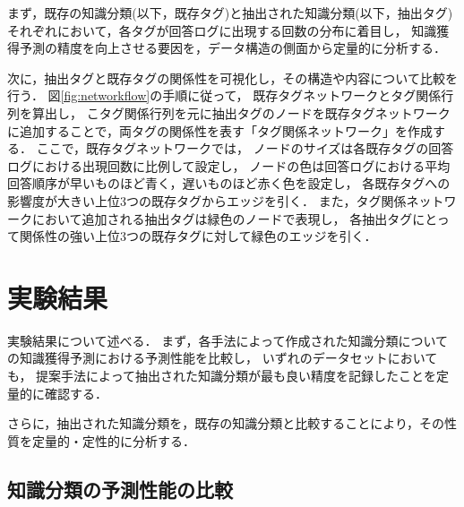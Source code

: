 まず，既存の知識分類(以下，既存タグ)と抽出された知識分類(以下，抽出タグ)それぞれにおいて，各タグが回答ログに出現する回数の分布に着目し，
知識獲得予測の精度を向上させる要因を，データ構造の側面から定量的に分析する．

次に，抽出タグと既存タグの関係性を可視化し，その構造や内容について比較を行う．
図\ref{fig:networkflow}の手順に従って，
既存タグネットワークとタグ関係行列を算出し，
こタグ関係行列を元に抽出タグのノードを既存タグネットワークに追加することで，両タグの関係性を表す「タグ関係ネットワーク」を作成する．
ここで，既存タグネットワークでは，
ノードのサイズは各既存タグの回答ログにおける出現回数に比例して設定し，
ノードの色は回答ログにおける平均回答順序が早いものほど青く，遅いものほど赤く色を設定し，
各既存タグへの影響度が大きい上位3つの既存タグからエッジを引く．
また，タグ関係ネットワークにおいて追加される抽出タグは緑色のノードで表現し，
各抽出タグにとって関係性の強い上位3つの既存タグに対して緑色のエッジを引く．




\section{実験結果}
実験結果について述べる．
まず，各手法によって作成された知識分類についての知識獲得予測における予測性能を比較し，
いずれのデータセットにおいても，
提案手法によって抽出された知識分類が最も良い精度を記録したことを定量的に確認する．

さらに，抽出された知識分類を，既存の知識分類と比較することにより，その性質を定量的・定性的に分析する．



\subsection{知識分類の予測性能の比較}

